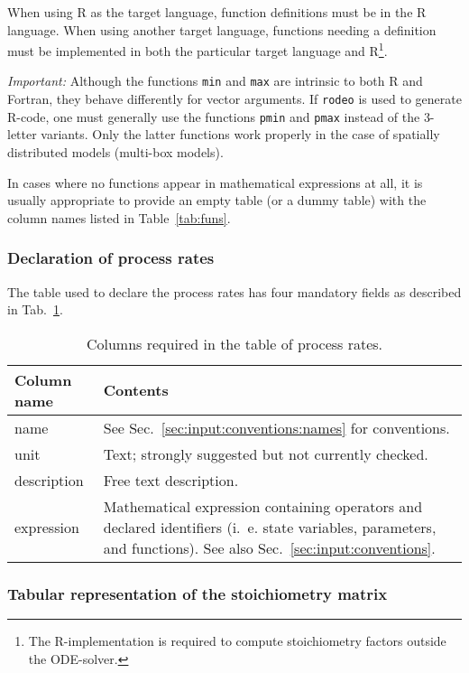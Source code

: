 \documentclass[a4paper]{article}
\newcommand{\rodeo}{\texttt{rodeo}}
\begin{document}
When using R as the target language, function definitions must be in the R 
language. When using another target language, functions needing a definition 
must be implemented in both the particular target language and R\footnote{The 
R-implementation is required to compute stoichiometry factors outside the 
ODE-solver.}.

\emph{Important:} Although the functions \texttt{min} and \texttt{max} are 
intrinsic to both R and Fortran, they behave differently for vector arguments. 
If \rodeo{} is used to generate R-code, one must generally use the functions 
\texttt{pmin} and \texttt{pmax} instead of the 3-letter variants. Only the 
latter functions work properly in the case of spatially distributed 
models (multi-box models).

In cases where no functions appear in mathematical expressions at all, it is usually appropriate to provide an empty table (or a dummy table) with the column names listed in Table~\ref{tab:funs}.

\subsubsection{Declaration of process rates} \label{sec:input:tables:processes}

The table used to declare the process rates has four mandatory fields as described in Tab.~\ref{tab:processes}.

\begin{table}[!h]
  \caption{Columns required in the table of process rates. \label{tab:processes}}
  \begin{tabular}{lp{}} \hline\hline
    \textbf{Column name} & \textbf{Contents} \\ \hline
    name & See Sec.~\ref{sec:input:conventions:names} for conventions. \\
    unit & Text; strongly suggested but not currently checked. \\
    description & Free text description. \\
    expression & Mathematical expression containing operators and declared identifiers (i.~e. state variables, parameters, and functions). See also Sec.~\ref{sec:input:conventions}. \\
    \hline
  \end{tabular}
\end{table}

\subsubsection{Tabular representation of the stoichiometry matrix} \label{sec:input:tables:stoichiometry}
\end{document}
